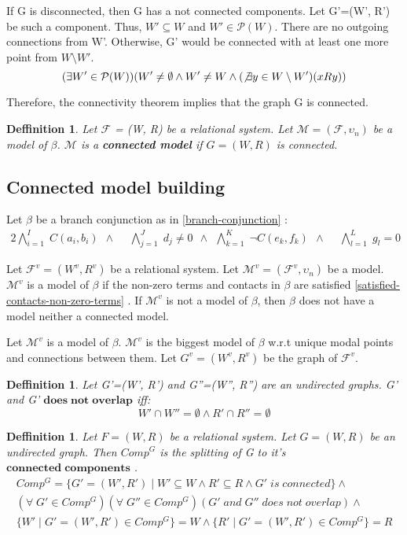 \documentclass{article}
\newcommand\M{\mathcal{M}}
\newcommand\F{\mathcal{F}}
\newcommand\p{\mathcal{P}}
\newtheorem{defn}[theorem]{Deffinition}
\newcommand{\BranchConjunction}{%
\begin{alignat}{2}
			\bigwedge_{i=1}^{I} \; C(a_i, b_i) \:\: \wedge \:\: &
			\bigwedge_{j=1}^{J} \; d_j \neq 0 \:\: \wedge \:\:
			\bigwedge_{k=1}^{K} \; \neg C(e_k, f_k) \:\: \wedge \:\: &
			\bigwedge_{l=1}^{L} \; g_l = 0 \:\:
\end{alignat}%
}
\begin{document}
	If G is disconnected, then G has a not connected components. Let G'=(W', R') be such a component. Thus, $W' \subseteq W$ and $W' \in \p(W)$. There are no outgoing connections from W'. Otherwise, G' would be connected with at least one more point from $W \setminus W'$.
		\begin{equation}
			(\exists W' \in \p(W))(W' \neq \emptyset \land W' \neq W \land (\not\exists y \in W \setminus W')(xRy))
		\end{equation}

	Therefore, the connectivity theorem implies that the graph G is connected.

	\begin{defn}
		Let $\F$ = (W, R) be a relational system. Let $\M = (\F, \upsilon_n)$ be a model of $\beta$. $\M$ is a \textbf{connected model} if $G = (W, R)$ is connected.
	\end{defn}

	\subsection{Connected model building}

		Let $\beta$ be a branch conjunction as in \ref{branch-conjunction} :
		\nonumber\BranchConjunction

		Let $\F^v = (W^v, R^v)$ be a relational system. Let $\M^v = (\F^v, \upsilon_n)$ be a model. $\M^v$ is a model of $\beta$ if the non-zero terms and contacts in $\beta$ are satisfied \ref{satisfied-contacts-non-zero-terms} .	If $\M^v$ is not a model of $\beta$, then $\beta$ does not have a model neither a connected model.

		Let $\M^v$ is a model of $\beta$. $\M^v$ is the biggest model of $\beta$ w.r.t unique modal points and connections between them. Let $G^v=(W^v, R^v)$ be the graph of $\F^v$.

		\begin{defn}
			Let G'=(W', R') and G''=(W'', R'') are an undirected graphs. G' and G' $\mathbf{does \; not \; overlap}$ iff:
			\begin{equation}
				W' \cap W'' = \emptyset \land R' \cap R'' = \emptyset
			\end{equation}
		\end{defn}

		\begin{defn}
			Let $F = (W, R)$ be a relational system. Let $G = (W, R)$ be an undirected graph. Then $Comp^G$ is the splitting of G to it's $\mathbf{connected \; components}$ .
			\begin{align*}
				Comp^G = \{G'=(W', R') \mid W' \subseteq W \land R' \subseteq R \land G'\;is\;connected \} \land \\
				(\forall \; G' \in Comp^G)(\forall \; G'' \in Comp^G)(G' \; and \; G'' \; does \; not \; overlap) \land \\
				\{ W' \mid G'=(W', R') \in Comp^G \} = W \land \{ R' \mid G'=(W', R') \in Comp^G \} = R
			\end{align*}
		\end{defn}
\end{document}
